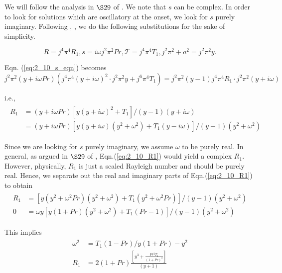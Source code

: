 We will follow the analysis in $\S 29$ of \cite{chandrasekhar1961hydrodynamic}. We note that $s$ can be complex. In order to look for solutions which are oscillatory at the onset, we look for $s$ purely imaginary. Following \cite{chandrasekhar1961hydrodynamic}, \cite{drazin2004hydrodynamic}, we do the following substitutions for the sake of simplicity. 

\begin{equation}\label{eq:2_10_substitutions}
 R = j^{4}\pi^{4}R_{1}, s = i \omega j^{2}\pi^{2} Pr, \mathcal{T} = j^{4}\pi^{4}T_{1}, j^{2}\pi^{2} + a^{2} = j^{2}\pi^{2} y.
\end{equation}

Eqn. (\ref{eq:2_10_s_eqn}) becomes
\begin{equation*}
 j^{2}\pi^{2}(y + i\omega Pr)\left(j^{4}\pi^{4}(y + i\omega)^{2} \cdot j^{2}\pi^{2}y + j^{6}\pi^{4}T_{1}\right) = j^{2}\pi^{2} (y-1)j^{4}\pi^{4}R_{1}\cdot j^{2}\pi^{2}(y + i\omega) 
\end{equation*}

i.e.,
\begin{align}\label{eq:2_10_R1}
 \begin{split}
  R_{1} &= (y + i\omega Pr)\left[y(y + i\omega)^{2} + T_{1} \right]/(y-1)(y+i\omega) \\
  & = (y + i\omega Pr)\left[y(y + i\omega)(y^{2}+\omega^{2}) + T_{1}(y-i\omega)\right]/(y-1)(y^{2}+\omega^{2})
 \end{split}
\end{align}

Since we are looking for $s$ purely imaginary, we assume $\omega$ to be purely real. In general, as argued in $\S 29$ of \cite{chandrasekhar1961hydrodynamic}, Eqn.(\ref{eq:2_10_R1}) would yield a complex $R_{1}$. However, physically, $R_{1}$ is just a scaled Rayleigh number and should be purely real. Hence, we separate out the real and imaginary parts of Eqn.(\ref{eq:2_10_R1}) to obtain
\begin{align}\label{eq:2_10_R1_re_im}
 \begin{split}
  R_{1} &= \left[y(y^{2} + \omega^{2}Pr) (y^{2}+\omega^{2}) + T_{1}(y^{2} + \omega^{2}Pr)\right]/(y-1)(y^{2}+\omega^{2})\\
  0 &= \omega y \left[y(1 + Pr)(y^{2}+\omega^{2}) + T_{1}(Pr - 1) \right]/(y-1)(y^{2}+\omega^{2})
 \end{split}
\end{align}

This implies
\begin{align}\label{eq:2_10_omega_R1_expressions}
 \begin{split}
  \omega^{2} &= T_{1}(1-Pr)/y(1+Pr) - y^{2}\\
  R_{1} &= 2(1+Pr) \frac{\left[y^{3} + \frac{Pr^{2}T_{1}}{(1+Pr)^{2}} \right]}{(y+1)}
 \end{split}
\end{align}

